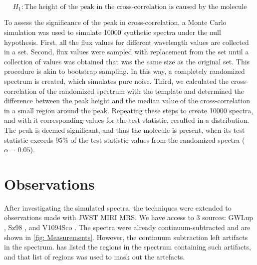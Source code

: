 \documentclass[twoside, single, authoryear, semicolon, 12pt]{lion-msc}
\newcommand{\4}{$_4$}
\newcommand{\3}{$_3$}
\newcommand{\2}{$_2$}
\begin{document}
\begin{equation}
    H_1: \text{The height of the peak in the cross-correlation is caused by the molecule}
\end{equation}

To assess the significance of the peak in cross-correlation, a Monte Carlo simulation was used to simulate 10000 synthetic spectra under the null hypothesis. First, all the flux values for different wavelength values are collected in a set. Second, flux values were sampled with replacement from the set until a collection of values was obtained that was the same size as the original set. This procedure is akin to bootstrap sampling. In this way, a completely randomized spectrum is created, which simulates pure noise. Third, we calculated the cross-correlation of the randomized spectrum with the template and determined the difference between the peak height and the median value of the cross-correlation in a small region around the peak. Repeating these steps to create 10000 spectra, and with it corresponding values for the test statistic, resulted in a distribution. The peak is deemed significant, and thus the molecule is present, when its test statistic exceeds 95\% of the test statistic values from the randomized spectra ($\alpha=0.05$).


\section{Observations}
After investigating the simulated spectra, the techniques were extended to observations made with JWST MIRI MRS. We have access to 3 sources: GWLup \citep{Gasman_2023}, Sz98 \citep{Grant_2023}, and V1094Sco \citep{taboneinprepp}. The spectra were already continuum-subtracted and are shown in \autoref{fig: Measurements}. However, the continuum subtraction left artifacts in the spectrum. \cite{Grant_2023} has listed the regions in the spectrum containing such artifacts, and that list of regions was used to mask out the artefacts. 
\end{document}
